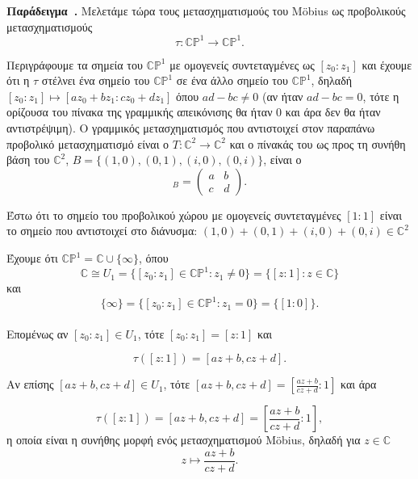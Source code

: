 \documentclass[12pt, a4paper]{book}
\newcounter{example}[section]
\newenvironment{example}[1][]{\refstepcounter{example}\par\medskip
   \textbf{Παράδειγμα~\theexample. #1} \rmfamily}{\medskip}
\begin{document}
\begin{example}
Μελετάμε τώρα τους μετασχηματισμούς του \foreignlanguage{english}{Möbius} ως προβολικούς μετασχηματισμούς
\begin{displaymath}
τ:\mathbb{C}\mathbb{P}^1 \rightarrow \mathbb{C}\mathbb{P}^1.
\end{displaymath}

Περιγράφουμε τα σημεία του $\mathbb{C}\mathbb{P}^1$ με ομογενείς συντεταγμένες ως $[z_0:z_1]$ και έχουμε ότι η $τ$ στέλνει ένα σημείο του $\mathbb{C}\mathbb{P}^1$ σε ένα άλλο σημείο του $\mathbb{C}\mathbb{P}^1$, δηλαδή $[z_0:z_1] \mapsto [az_0+bz_1:cz_0+dz_1]$ όπου $ad-bc \neq 0$ (αν ήταν $ad-bc=0$, τότε η ορίζουσα του πίνακα της γραμμικής απεικόνισης θα ήταν 0 και άρα δεν θα ήταν αντιστρέψιμη). Ο γραμμικός μετασχηματισμός που αντιστοιχεί στον παραπάνω προβολικό μετασχηματισμό είναι ο $T: \mathbb{C}^2 \rightarrow \mathbb{C}^2$ και ο πίνακάς του ως προς τη συνήθη βάση του $\mathbb{C}^2$, $B=\{(1,0),(0,1),(i,0),(0,i)\}$, είναι ο
\begin{displaymath}
[T]_B=
\begin{pmatrix}
a&b\\c&d
\end{pmatrix}.
\end{displaymath}

Έστω ότι το σημείο του προβολικού χώρου με ομογενείς συντεταγμένες $[1:1]$ είναι το σημείο που αντιστοιχεί στο διάνυσμα: $(1,0)+(0,1)+(i,0)+(0,i) \in \mathbb{C}^2$

Έχουμε ότι $\mathbb{C}\mathbb{P}^1 = \mathbb{C} \cup \{\infty\}$, όπου
\begin{displaymath}
\mathbb{C} \cong U_1 = \{[z_0:z_1] \in \mathbb{C}\mathbb{P}^1: z_1 \neq 0\}=\{[z:1]:z \in \mathbb{C}\}
\end{displaymath}
 και 
\begin{displaymath}
\{\infty\} = \{[z_0:z_1] \in \mathbb{C}\mathbb{P}^1: z_1 = 0\}=\{[1:0]\}.
\end{displaymath} \\

Επομένως αν $[z_0:z_1] \in U_1$, τότε $[z_0:z_1]=[z:1]$ και 

\begin{displaymath}
τ([z:1])=[az+b,cz+d].
\end{displaymath}

Αν επίσης $[az+b,cz+d] \in U_1$, τότε $[az+b,cz+d] = [\frac{az+b}{cz+d}:1]$ και άρα

\begin{displaymath}
τ([z:1])=[az+b,cz+d]= [\frac{az+b}{cz+d}:1],
\end{displaymath}
η οποία είναι η συνήθης μορφή ενός μετασχηματισμού \foreignlanguage{english}{Möbius}, δηλαδή 
για $z \in \mathbb{C}$
\begin{displaymath}
z \mapsto \frac{az+b}{cz+d}.
\end{displaymath}


\end{example}
\end{document}
